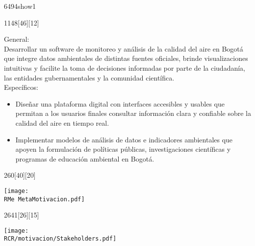 \begin{NuevaPagina}{64}{94}{show1}
\begin{NuevoParrafo}{11}{48}[46][12]
		\begin{Marco}[\LineaSupC][\LineaInfC][\LineaIzqC][\LineaDerC][CBlanco]
			\begin{Objetivos}[Objetivos]
				{	{\large General:}\vspace{5pt}\\
					{\linespread{.8}\selectfont Desarrollar un software de monitoreo y análisis de la calidad del aire en Bogotá que integre datos ambientales de distintas fuentes oficiales, brinde visualizaciones intuitivas y facilite la toma de decisiones informadas por parte de la ciudadanía, las entidades gubernamentales y la comunidad científica.}\\[0.3cm]
					{\large Específicos:}
					{\begin{itemize}
							\setlength{\itemsep}{-0.5pt}
							\setlength{\parskip}{0pt}
							\setlength{\parsep}{0pt}
							\item Diseñar una plataforma digital con interfaces accesibles y usables que permitan a los usuarios finales consultar información clara y confiable sobre la calidad del aire en tiempo real.
							\item Implementar modelos de análisis de datos e indicadores ambientales que apoyen la formulación de políticas públicas, investigaciones científicas y programas de educación ambiental en Bogotá.
					\end{itemize}}
				}
			\end{Objetivos}
		\end{Marco}
	\end{NuevoParrafo}
	

	\begin{NuevoParrafo}{26}{0}[40][20]
		\begin{Marco}[\LineaSupC][\LineaInfC][\LineaIzqC][\LineaDerC][CBlanco]
			\centering\texttt{[image: \\RMe MetaMotivacion.pdf]}
		\end{Marco}
	\end{NuevoParrafo}
	
	\begin{NuevoParrafo}{26}{41}[26][15]
		\begin{Marco}[\LineaSupC][\LineaInfC][\LineaIzqC][\LineaDerC][CBlanco]
		\subseccionC{\PVSta}%
		\centering\texttt{[image: \\RCR/motivacion/Stakeholders.pdf]}
		\end{Marco}
	\end{NuevoParrafo}


\end{NuevaPagina}
